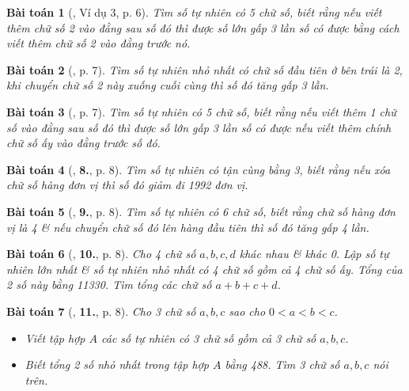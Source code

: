 \documentclass[oneside]{book}
\numberwithin{equation}{section}
\newtheorem{baitoan}{Bài toán}[section]
\begin{document}
\begin{baitoan}[\cite{Binh_Toan_6_tap_1}, Ví dụ 3, p. 6]
	Tìm số tự nhiên có 5 chữ số, biết rằng nếu viết thêm chữ số 2 vào đằng sau số đó thì được số lớn gấp 3 lần số có được bằng cách viết thêm chữ số 2 vào đằng trước nó.
\end{baitoan}

\begin{baitoan}[\cite{Binh_Toan_6_tap_1}, p. 7]
	Tìm số tự nhiên nhỏ nhất có chữ số đầu tiên ở bên trái là 2, khi chuyển chữ số 2 này xuống cuối cùng thì số đó tăng gấp 3 lần.
\end{baitoan}

\begin{baitoan}[\cite{Binh_Toan_6_tap_1}, p. 7]
	Tìm số tự nhiên có 5 chữ số, biết rằng nếu viết thêm 1 chữ số vào đằng sau số đó thì được số lớn gấp 3 lần số có được nếu viết thêm chính chữ số ấy vào đằng trước số đó.
\end{baitoan}

\begin{baitoan}[\cite{Binh_Toan_6_tap_1}, \textbf{8.}, p. 8]
	Tìm số tự nhiên có tận cùng bằng 3, biết rằng nếu xóa chữ số hàng đơn vị thì số đó giảm đi 1992 đơn vị.
\end{baitoan}

\begin{baitoan}[\cite{Binh_Toan_6_tap_1}, \textbf{9.}, p. 8]
	Tìm số tự nhiên có 6 chữ số, biết rằng chữ số hàng đơn vị là 4 \& nếu chuyển chữ số đó lên hàng đầu tiên thì số đó tăng gấp 4 lần.
\end{baitoan}

\begin{baitoan}[\cite{Binh_Toan_6_tap_1}, \textbf{10.}, p. 8]
	Cho 4 chữ số $a,b,c,d$ khác nhau \& khác 0. Lập số tự nhiên lớn nhất \& số tự nhiên nhỏ nhất có 4 chữ số gồm cả 4 chữ số ấy. Tổng của 2 số này bằng 11330. Tìm tổng các chữ số $a + b + c + d$.
\end{baitoan}

\begin{baitoan}[\cite{Binh_Toan_6_tap_1}, \textbf{11.}, p. 8]
	Cho 3 chữ số $a,b,c$ sao cho $0 < a < b < c$.
	\begin{itemize}
		\item[(a)] Viết tập hợp $A$ các số tự nhiên có 3 chữ số gồm cả 3 chữ số $a,b,c$.
		\item[(b)] Biết tổng 2 số nhỏ nhất trong tập hợp $A$ bằng 488. Tìm 3 chữ số $a,b,c$ nói trên.
	\end{itemize}
\end{baitoan}
\end{document}
